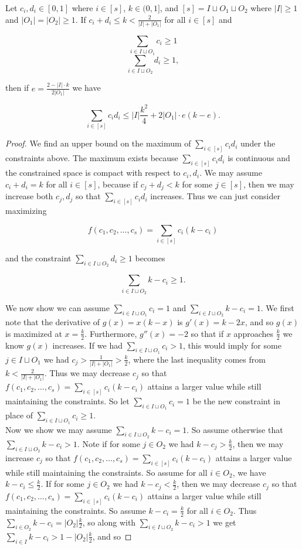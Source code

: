 \documentclass[10pt,a4paper]{amsart}
\begin{document}
\begin{lemma}
Let $c_i, d_i \in [0,1]$ where $i \in [s]$, $k \in (0,1]$, and $[s] = I \sqcup O_1 \sqcup O_2$ where $|I| \geq 1$ and $|O_1| = |O_2| \geq 1$. If $c_i + d_i \leq k < \frac{2}{|I|+|O_1|}$ for all $i \in [s]$ and 

$$\sum_{i \in I \sqcup O_1} c_i \geq 1$$ 
$$\sum_{i \in I \sqcup O_2} d_i \geq 1,$$

\noindent
then if $e = \frac{2-|I| \cdot k}{2|O_1|}$ we have 

$$\sum_{i \in [s]} c_id_i \leq |I|\frac{k^2}{4} + 2|O_1| \cdot e(k-e).$$ 
\end{lemma}

\begin{proof}
We find an upper bound on the maximum of $\sum_{i \in [s]} c_id_i$ under the constraints above. The maximum exists because $\sum_{i \in [s]} c_id_i$ is continuous and the constrained space is compact with respect to $c_i,d_i$. We may assume $c_i + d_i = k$ for all $i \in [s]$, because if $c_j + d_j < k$ for some $j \in [s]$, then we may increase both $c_j,d_j$ so that $\sum_{i \in [s]} c_id_i$ increases. Thus we can just consider maximizing  

$$f(c_1,c_2,\ldots,c_{s}) = \sum_{i \in [s]} c_i(k-c_i)$$

\noindent
and the constraint $\sum_{i \in I \sqcup O_2} d_i \geq 1$ becomes

$$\sum_{i \in I \sqcup O_2} k-c_i  \geq 1.$$

We now show we can assume $\sum_{i \in I \sqcup O_1} c_i  = 1$ and $\sum_{i \in I \sqcup O_2} k-c_i  = 1$. We first note that the derivative of $g(x) = x(k-x)$ is $g'(x) = k-2x$, and so $g(x)$ is maximized at $x = \frac{k}{2}$. Furthermore, $g''(x) = -2$ so that if $x$ approaches $\frac{k}{2}$ we know $g(x)$ increases. If we had $\sum_{i \in I \sqcup O_1} c_i  > 1$, this would imply for some $j \in I \sqcup O_1$ we had $c_j > \frac{1}{|I| + |O_1|} > \frac{k}{2}$, where the last inequality comes from $k < \frac{2}{|I|+|O_1|}$. Thus we may decrease $c_j$ so that $f(c_1,c_2,\ldots,c_{s}) = \sum_{i \in [s]} c_i(k-c_i)$ attains a larger value while still maintaining the constraints. So let $\sum_{i \in I \sqcup O_1} c_i  = 1$ be the new constraint in place of $\sum_{i \in I \sqcup O_1} c_i  \geq 1$. \\

Now we show we may assume $\sum_{i \in I \sqcup O_2} k-c_i = 1$. So assume otherwise that $\sum_{i \in I \sqcup O_2} k-c_i > 1$. Note if for some $j \in O_2$ we had $k -  c_j > \frac{k}{2}$, then we may increase $c_j$ so that $f(c_1,c_2,\ldots,c_{s}) = \sum_{i \in [s]} c_i(k-c_i)$ attains a larger value while still maintaining the constraints. So assume for all $i \in O_2$, we have $k-c_i \leq \frac{k}{2}$. If for some $j \in O_2$ we had $k-c_j < \frac{k}{2}$, then we may decrease $c_j$ so that $f(c_1,c_2,\ldots,c_{s}) = \sum_{i \in [s]} c_i(k-c_i)$ attains a larger value while still maintaining the constraints. So assume $k-c_i = \frac{k}{2}$ for all $i \in O_2$. Thus $\sum_{i \in O_2} k-c_i = |O_2|\frac{k}{2}$, so along with $\sum_{i \in I \sqcup O_2} k-c_i > 1$ we get $\sum_{i \in I} k-c_i > 1 - | O_2|\frac{k}{2}$, and so 


\end{proof}
\end{document}
